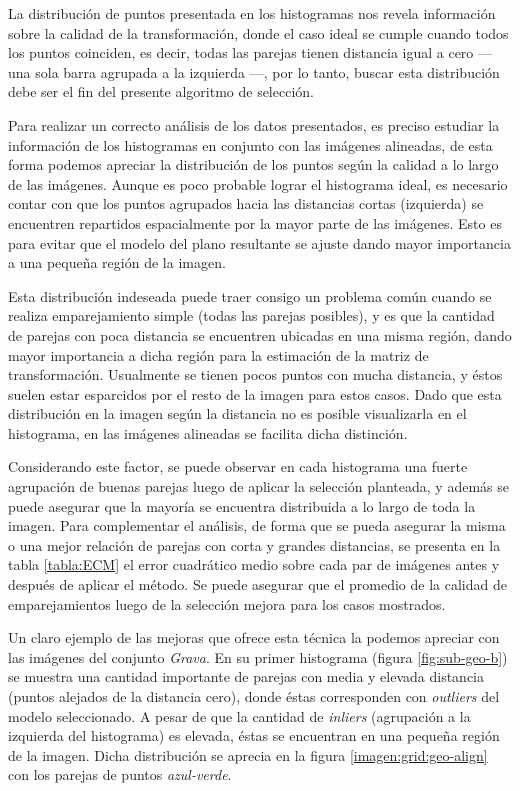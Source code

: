La distribución de puntos presentada en los histogramas nos revela información sobre la calidad de la transformación, donde el caso ideal se cumple cuando todos los puntos coinciden, es decir, todas las parejas tienen distancia igual a cero --- una sola barra agrupada a la izquierda ---, por lo tanto, buscar esta distribución debe ser el fin del presente algoritmo de selección. 

Para realizar un correcto análisis de los datos presentados, es preciso estudiar la información de los histogramas en conjunto con las imágenes alineadas, de esta forma podemos apreciar la distribución de los puntos según la calidad a lo largo de las imágenes. Aunque es poco probable lograr el histograma ideal, es necesario contar con que los puntos agrupados hacia las distancias cortas (izquierda) se encuentren repartidos espacialmente por la mayor parte de las imágenes. Esto es para evitar que el modelo del plano resultante se ajuste dando mayor importancia a una pequeña región de la imagen.

Esta distribución indeseada puede traer consigo un problema común cuando se realiza emparejamiento simple (todas las parejas posibles), y es que la cantidad de parejas con poca distancia se encuentren ubicadas en una misma región, dando mayor importancia a dicha región para la estimación de la matriz de transformación. Usualmente se tienen pocos puntos con mucha distancia, y éstos suelen estar esparcidos por el resto de la imagen para estos casos. Dado que esta distribución en la imagen según la distancia no es posible visualizarla en el histograma, en las imágenes alineadas se facilita dicha distinción.

Considerando este factor, se puede observar en cada histograma una fuerte agrupación de buenas parejas luego de aplicar la selección planteada, y además se puede asegurar que la mayoría se encuentra distribuida a lo largo de toda la imagen. Para complementar el análisis, de forma que se pueda asegurar la misma o una mejor relación de parejas con corta y grandes distancias, se presenta en la tabla \ref{tabla:ECM} el error cuadrático medio sobre cada par de imágenes antes y después de aplicar el método. Se puede asegurar que el promedio de la calidad de emparejamientos luego de la selección mejora para los casos mostrados.


Un claro ejemplo de las mejoras que ofrece esta técnica la podemos apreciar con las imágenes del conjunto \textit{Grava}. En su primer histograma (figura \ref{fig:sub-geo-b}) se muestra una cantidad importante de parejas con media y elevada distancia (puntos alejados de la distancia cero), donde éstas corresponden con \textit{outliers} del modelo seleccionado. A pesar de que la cantidad  de \textit{inliers} (agrupación a la izquierda del histograma) es elevada, éstas se encuentran en una pequeña región de la imagen. Dicha distribución se aprecia en la figura \ref{imagen:grid:geo-align} con los parejas de puntos \textit{azul-verde}. 

